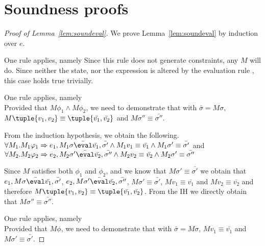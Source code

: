 


\section{Soundness proofs}

\begin{proof}[Proof of Lemma~\ref{lem:soundeval}]
  We prove Lemma~\ref{lem:soundeval} by induction over $e$.

  {One rule applies, namely 
  Since this rule does not generate constraints, any $M$ will do.
  Since neither the state, nor the expression is altered by the evaluation rule ,
  this case holds true trivially.
  }

  {One rule applies, namely \\
  Provided that $M\phi_1\wedge M\phi_2$,
  we need to demonstrate that   with $\bar{\sigma}=M\sigma$,
  $M\tuple{v_1,v_2} \equiv \tuple{\bar{v_1},\bar{v_2}}$ and $M\sigma''\equiv\bar{\sigma''}$.

  From the induction hypothesis, we obtain the following.\\
  $\forall M_1 .  M_1\phi_1 \implies e_1, M_1\sigma \bar{\eval}\bar{v_1},\bar{\sigma'}\land  M_1v_1\equiv \bar{v_1} \land  M_1\sigma'\equiv\bar{\sigma'}$ and
  $\forall M_2 . M_2\phi_2 \implies e_2,M_2\sigma' \bar{\eval}\bar{v_2},\bar{\sigma''}\land M_2v_2\equiv \bar{v_2} \wedge M_2\sigma'\equiv\bar{\sigma''}$

  Since $M$ satisfies both $\phi_1$ and $\phi_2$,
  and we know that $M\sigma'\equiv \bar{\sigma'}$
  we obtain that $e_1,M\sigma \bar{\eval}\bar{v_1},\bar{\sigma'}$,
  $e_2,M\sigma'\bar{\eval}\bar{v_2},\bar{\sigma''}$, $M\sigma'\equiv \bar{\sigma'}$,
 $M v_1\equiv \bar{v_1}$ and $M v_2 \equiv \bar{v_2}$ and therefore $M\tuple{v_1,v_2} \equiv \tuple{\bar{v_1},\bar{v_2}}$.
  From the IH we directly obtain that $M \sigma'' \equiv\bar{\sigma''}$.
  }

{
  One rule applies, namely \\
  Provided that $M\phi$,
  we need to demonstrate that  with $\bar{\sigma}=M\sigma$,
  $M v_1\equiv \bar{v_1}$ and $M\sigma'\equiv\bar{\sigma'}$.

}
\end{proof}
